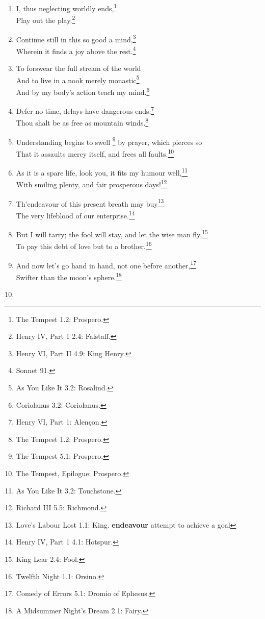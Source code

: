 \documentclass[17pt,twoside]{extarticle}
\begin{document}
\begin{enumerate}
{    Shrew 4.5: Katherina.}\\But thy eternal summer shall not
  fade.\footnote{Sonnet 18.}
\item
  I, thus neglecting worldly ends,\footnote{The Tempest 1.2: Prospero.}\\Play
  out the play.\footnote{Henry IV, Part 1 2.4: Falstaff.}
\item
  Continue still in this so good a mind,\footnote{Henry VI, Part II 4.9:
    King Henry.}\\Wherein it finds a joy above the rest.\footnote{Sonnet
    91.}
\item
  To forswear the full stream of the world\\And to live in a nook merely
  monastic\footnote{As You Like It 3.2: Rosalind.}\\And by my body's
  action teach my mind.\footnote{Coriolanus 3.2: Coriolanus.}
\item
  Defer no time, delays have dangerous ends;\footnote{Henry VI, Part 1:
    Alençon.}\\Thou shalt be as free as mountain winds.\footnote{The
    Tempest 1.2: Prospero.}
\item
  Understanding begins to swell \footnote{The Tempest 5.1: Prospero.} by
  prayer, which pierces so\\That it assaults mercy itself, and frees all
  faults.\footnote{The Tempest, Epilogue: Prospero.}
\item
  As it is a spare life, look you, it fits my humour well,\footnote{As
    You Like It 3.2: Touchstone.}\\With smiling plenty, and fair
  prosperous days!\footnote{Richard III 5.5: Richmond.}
\item
  Th'endeavour of this present breath may buy\footnote{Love's Labour
    Lost 1.1: King. \textbf{endeavour} attempt to achieve a goal}\\The
  very lifeblood of our enterprise.\footnote{Henry IV, Part 1 4.1:
    Hotspur.}
\item
  But I will tarry; the fool will stay, and let the wise man
  fly,\footnote{King Lear 2.4: Fool.}\\To pay this debt of love but to a
  brother.\footnote{Twelfth Night 1.1: Orsino.}
\item
  And now let's go hand in hand, not one before another,\footnote{Comedy
    of Errors 5.1: Dromio of Ephesus.}\\Swifter than the moon's
  sphere.\footnote{A Midsummer Night's Dream 2.1: Fairy.}
\item

\end{enumerate}
\end{document}
